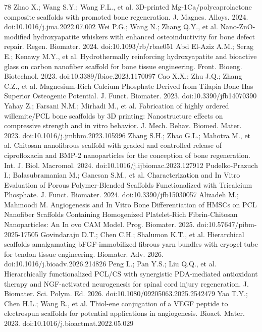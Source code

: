 \documentclass[5p,times,twocolumn]{elsarticle}
\begin{document}
\begin{thebibliography}{78}
 Zhao X.; Wang S.Y.; Wang F.L., et al. 3D-printed Mg-1Ca/polycaprolactone composite scaffolds with promoted bone regeneration. J. Magnes. Alloys. 2024. doi:10.1016/j.jma.2022.07.002
 Wei P.G.; Wang N.; Zhang Q.Y., et al. Nano-ZnO-modified hydroxyapatite whiskers with enhanced osteoinductivity for bone defect repair. Regen. Biomater. 2024. doi:10.1093/rb/rbae051
 Abd El-Aziz A.M.; Serag E.; Kenawy M.Y., et al. Hydrothermally reinforcing hydroxyapatite and bioactive glass on carbon nanofiber scaffold for bone tissue engineering. Front. Bioeng. Biotechnol. 2023. doi:10.3389/fbioe.2023.1170097
 Cao X.X.; Zhu J.Q.; Zhang C.Z., et al. Magnesium-Rich Calcium Phosphate Derived from Tilapia Bone Has Superior Osteogenic Potential. J. Funct. Biomater. 2023. doi:10.3390/jfb14070390
 Yahay Z.; Farsani N.M.; Mirhadi M., et al. Fabrication of highly ordered willemite/PCL bone scaffolds by 3D printing: Nanostructure effects on compressive strength and in vitro behavior. J. Mech. Behav. Biomed. Mater. 2023. doi:10.1016/j.jmbbm.2023.105996
 Zhang S.H.; Zhao G.L.; Mahotra M., et al. Chitosan nanofibrous scaffold with graded and controlled release of ciprofloxacin and BMP-2 nanoparticles for the conception of bone regeneration. Int. J. Biol. Macromol. 2024. doi:10.1016/j.ijbiomac.2023.127912
 Pudelko-Prazuch I.; Balasubramanian M.; Ganesan S.M., et al. Characterization and In Vitro Evaluation of Porous Polymer-Blended Scaffolds Functionalized with Tricalcium Phosphate. J. Funct. Biomater. 2024. doi:10.3390/jfb15030057
 Alizadeh M.; Mahmoodi M. Angiogenesis and In Vitro Bone Differentiation of HMSCs on PCL Nanofiber Scaffolds Containing Homogenized Platelet-Rich Fibrin-Chitosan Nanoparticles: An In ovo CAM Model. Prog. Biomater. 2025. doi:10.57647/pibm-2025-17505
 Govindaraju D.T.; Chen C.H.; Shalumon K.T., et al. Hierarchical scaffolds amalgamating bFGF-immobilized fibrous yarn bundles with cryogel tube for tendon tissue engineering. Biomater. Adv. 2026. doi:10.1016/j.bioadv.2026.214826
 Peng L.; Pan Y.S.; Liu Q.Q., et al. Hierarchically functionalized PCL/CS with synergistic PDA-mediated antioxidant therapy and NGF-activated neurogenesis for spinal cord injury regeneration. J. Biomater. Sci. Polym. Ed. 2026. doi:10.1080/09205063.2025.2542479
 Yao T.Y.; Chen H.L.; Wang R., et al. Thiol-ene conjugation of a VEGF peptide to electrospun scaffolds for potential applications in angiogenesis. Bioact. Mater. 2023. doi:10.1016/j.bioactmat.2022.05.029

\end{thebibliography}
\end{document}
